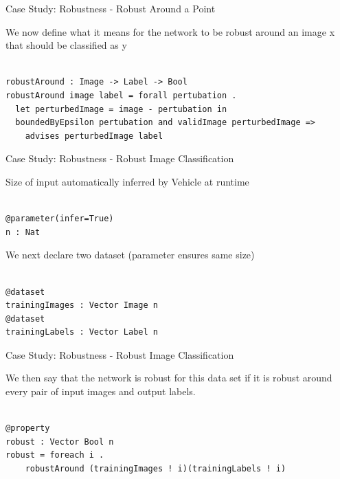 \documentclass[t,compress,aspectratio=169]{beamer}
\begin{document}
\begin{frame}[fragile]{Case Study: Robustness - Robust Around a Point}

We now define what it means for the network to be robust around an image x that should be classified as y

\begin{verbatim}

robustAround : Image -> Label -> Bool
robustAround image label = forall pertubation .
  let perturbedImage = image - pertubation in
  boundedByEpsilon pertubation and validImage perturbedImage =>
    advises perturbedImage label

\end{verbatim}



\end{frame}

\begin{frame}[fragile]{Case Study: Robustness - Robust Image Classification}

Size of input automatically inferred by Vehicle at runtime
\begin{verbatim}

@parameter(infer=True)
n : Nat

\end{verbatim}

We next declare two dataset (parameter ensures same size)

\begin{verbatim}

@dataset
trainingImages : Vector Image n
@dataset
trainingLabels : Vector Label n
\end{verbatim}
\end{frame}

\begin{frame}[fragile]{Case Study: Robustness - Robust Image Classification}

We then say that the network is robust for this data set if it is robust around every pair of input images and output labels.

\begin{verbatim}

@property
robust : Vector Bool n
robust = foreach i .
    robustAround (trainingImages ! i)(trainingLabels ! i)
\end{verbatim}



\end{frame}
\end{document}
